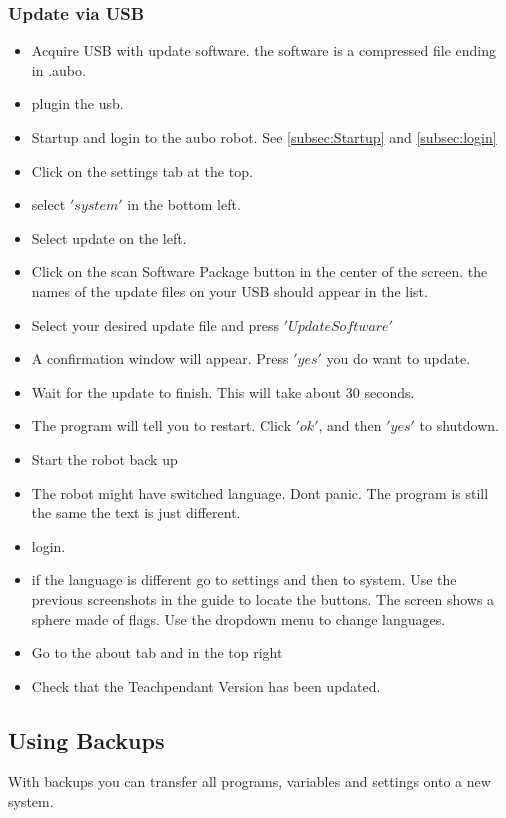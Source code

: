 \documentclass{article}
\begin{document}
\subsubsection{Update via USB}
\begin{itemize}
\item Acquire USB with update software. the software is a compressed file ending in .aubo. 
\item plugin the usb. 
\item Startup and login to the aubo robot. See \ref{subsec:Startup} and \ref{subsec:login} 
\item Click on the settings tab at the top. 
\item select $'system'$ in the bottom left. 
\item Select update on the left. 
\item Click on the scan Software Package button in the center of the screen. the names of the update files on your USB should appear in the list.
\item Select your desired update file and press $'Update Software'$
\item A confirmation window will appear. Press $'yes'$ you do want to update.
\item Wait for the update to finish. This will take about 30 seconds. 
\item The program will tell you to restart. Click $'ok'$, and then $'yes'$ to shutdown.
\item Start the robot back up
\item The robot might have switched language. Dont panic. The program is still the same the text is just different. 
\item login. 
\item if the language is different go to settings and then to system. Use the previous screenshots in the guide to locate the buttons. The screen shows a sphere made of flags. Use the dropdown menu to change languages.
\item Go to the about tab and in the top right
\item Check that the Teachpendant Version has been updated. 
\end{itemize}

\subsection{Using Backups} 
With backups you can transfer all programs, variables and settings onto a new system. 
\end{document}
